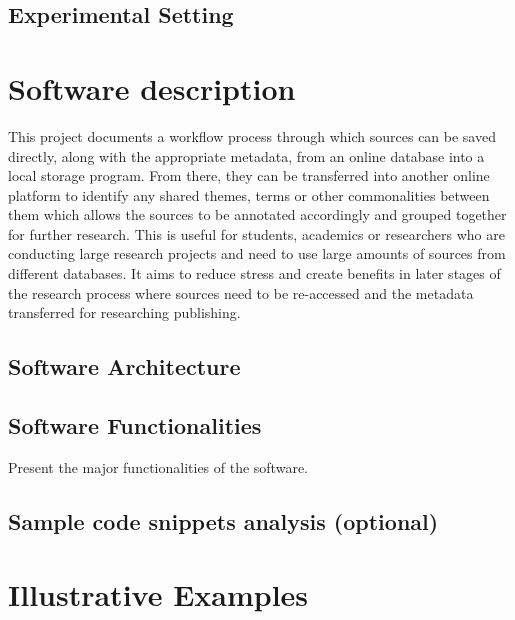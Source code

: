 \documentclass[preprint,12pt, a4paper]{elsarticle}
\begin{document}
\subsection{Experimental Setting}

\section{Software description}
\label{}
This project documents a workflow process through which sources can be saved directly, along with the appropriate metadata, from an online database into a local storage program. From there, they can be transferred into another online platform to identify any shared themes, terms or other commonalities between them which allows the sources to be annotated accordingly and grouped together for further research. This is useful for students, academics or researchers who are conducting large research projects and need to use large amounts of sources from different databases. It aims to reduce stress and create benefits in later stages of the research process where sources need to be re-accessed and the metadata transferred for researching publishing. 

\subsection{Software Architecture}
\label{}

\subsection{Software Functionalities}
\label{}

Present the major functionalities of the software.

\subsection{Sample code snippets analysis (optional)}
\label{}

\section{Illustrative Examples}
\label{}
\end{document}
